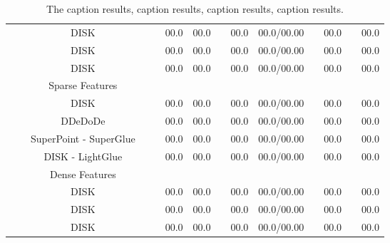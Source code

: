 \documentclass[letterpaper]{article} %
\begin{document}
\begin{table*}[ht!]
{\begin{tabular}{ccccc ccccc cccc}
&&DISK  && &00.0&00.0 & &00.0&00.0/00.00& &00.0& &00.0 \\
&&DISK  && &00.0&00.0 & &00.0&00.0/00.00& &00.0& &00.0 \\
&&DISK  && &00.0&00.0 & &00.0&00.0/00.00& &00.0& &00.0 \\
\midrule[0.5pt]  
            &Sparse Features  & &  & && && && && \\
            &&DISK && &00.0&00.0 & &00.0&00.0/00.00& &00.0& &00.0\\
&&DDeDoDe  && &00.0&00.0 & &00.0&00.0/00.00& &00.0& &00.0 \\
&&SuperPoint - SuperGlue  && &00.0&00.0 & &00.0&00.0/00.00& &00.0& &00.0 \\
&&DISK - LightGlue  && &00.0&00.0 & &00.0&00.0/00.00& &00.0& &00.0 \\
&&Dense Features & &  & && && && && \\
&&DISK  && &00.0&00.0 & &00.0&00.0/00.00& &00.0& &00.0 \\
&&DISK  && &00.0&00.0 & &00.0&00.0/00.00& &00.0& &00.0 \\
&&DISK  && &00.0&00.0 & &00.0&00.0/00.00& &00.0& &00.0 \\
       \end{tabular}
   }
   \caption{The caption results, caption results, caption results, caption results.}
\end{table*}
\end{document}
